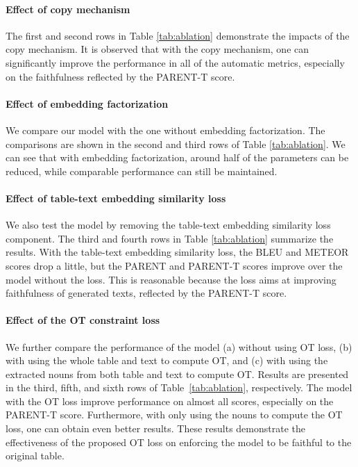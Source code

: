\documentclass[11pt,a4paper]{article}
\begin{document}
\vspace{-0.3cm}
\paragraph{Effect of copy mechanism}
The first and second rows in Table \ref{tab:ablation} demonstrate the impacts of the copy mechanism. It is observed that with the copy mechanism, one can significantly improve the performance in all of the automatic metrics, especially on the faithfulness reflected by the PARENT-T score.


\vspace{-0.1cm}
\paragraph{Effect of embedding factorization}
We compare our model with the one without embedding factorization. The comparisons are shown in the second and third rows of Table \ref{tab:ablation}. We can see that with embedding factorization, around half of the parameters can be reduced, while comparable performance can still be maintained.

\vspace{-0.1cm}
\paragraph{Effect of table-text embedding similarity loss}
We also test the model by removing the table-text embedding similarity loss component. The third and fourth rows in Table \ref{tab:ablation}  summarize the results. With the table-text embedding similarity loss, the BLEU and METEOR scores drop a little, but the PARENT and PARENT-T scores improve over the model without the loss. This is reasonable because the loss aims at improving faithfulness of generated texts, reflected by the PARENT-T score.

\vspace{-0.2cm}
\paragraph{Effect of the OT constraint loss}
We further compare the performance of the model (a) without using OT loss, (b) with using the whole table and text to compute OT, and (c) with using the extracted nouns from both table and text to compute OT. Results are presented in the third, fifth, and sixth rows of Table~\ref{tab:ablation}, respectively. The model with the OT loss improve performance on almost all scores, especially on the PARENT-T score. Furthermore, with only using the nouns to compute the OT loss, one can obtain even better results. These results demonstrate the effectiveness of the proposed OT loss on enforcing the model to be faithful to the original table.
\end{document}
